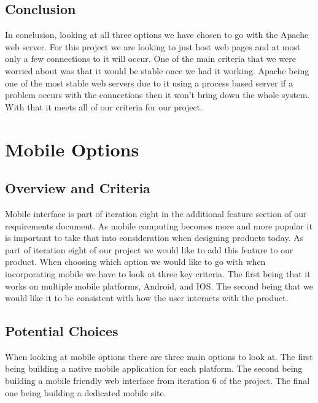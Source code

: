 \documentclass[onecolumn, draftclsnofoot,10pt, compsoc]{IEEEtran}
\begin{document}
		\subsection{Conclusion}
		In conclusion, looking at all three options we have chosen to go with the Apache web server.
		For this project we are looking to just host web pages and at most only a few connections
		to it will occur. One of the main criteria that we were worried about was that
		it would be stable once we had it working. Apache being one of the most stable
		web servers due to it using a process based server if a problem occurs with
		the connections then it won’t bring down the whole system. With that it meets
		all of our criteria for our project.
	\newpage
	\section{Mobile Options}
		\subsection{Overview and Criteria}
		Mobile interface is part of iteration eight in the additional feature section
		of our requirements document. As mobile computing becomes more and more popular
		it is important to take that into consideration when designing products today.
		As part of iteration eight of our project we would like to add this feature
		to our product. When choosing which option we would like to go with when
		incorporating mobile we have to look at three key criteria. The first being
		that it works on multiple mobile platforms, Android, and IOS. The second
		being that we would like it to be consistent with how the user interacts with the product.

		\subsection{Potential Choices }
		When looking at mobile options there are three main options to look at. The
		first being building a native mobile application for each platform. The second
		being building a mobile friendly web interface from iteration 6 of the project.
		The final one being building a  dedicated mobile site.
\end{document}
